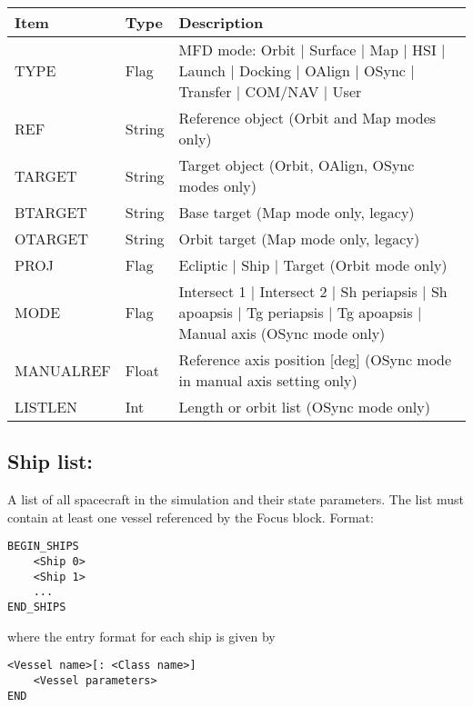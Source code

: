 \documentclass[Orbiter Developer Manual.tex]{subfiles}
\begin{document}
\begin{table}[H]
	\centering
	\begin{tabularx}{\textwidth}{ |l|l|X| }
	\hline\rule{0pt}{2ex}
	\textbf{Item} & \textbf{Type} & \textbf{Description}\\
	\hline\rule{0pt}{2ex}
	TYPE & Flag & MFD mode: Orbit | Surface | Map | HSI | Launch | Docking | OAlign | OSync | Transfer | COM/NAV | User\\
	\hline\rule{0pt}{2ex}
	REF & String & Reference object (Orbit and Map modes only)\\
	\hline\rule{0pt}{2ex}
	TARGET & String & Target object (Orbit, OAlign, OSync modes only)\\
	\hline\rule{0pt}{2ex}
	BTARGET & String & Base target (Map mode only, legacy)\\
	\hline\rule{0pt}{2ex}
	OTARGET & String & Orbit target (Map mode only, legacy)\\
	\hline\rule{0pt}{2ex}
	PROJ & Flag & Ecliptic | Ship | Target (Orbit mode only)\\
	\hline\rule{0pt}{2ex}
	MODE & Flag & Intersect 1 | Intersect 2 | Sh periapsis | Sh apoapsis | Tg periapsis | Tg apoapsis | Manual axis (OSync mode only)\\
	\hline\rule{0pt}{2ex}
	MANUALREF & Float & Reference axis position [deg] (OSync mode in manual axis setting only)\\
	\hline\rule{0pt}{2ex}
	LISTLEN & Int & Length or orbit list (OSync mode only)\\
	\hline
	\end{tabularx}
\end{table}

\subsection*{Ship list:}
A list of all spacecraft in the simulation and their state parameters. The list must contain at least one vessel referenced by the Focus block. Format:

\begin{lstlisting}[language=OSFS]
BEGIN_SHIPS
	<Ship 0>
	<Ship 1>
	...
END_SHIPS
\end{lstlisting}

\noindent
where the entry format for each ship is given by

\begin{lstlisting}[language=OSFS]
<Vessel name>[: <Class name>]
	<Vessel parameters>
END
\end{lstlisting}
\end{document}
